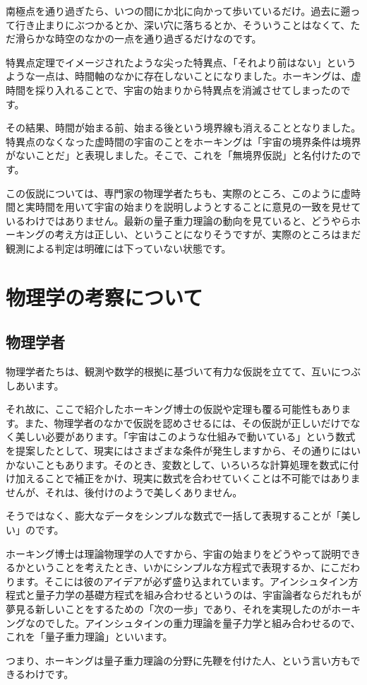 \documentclass[10pt,b5paper,papersize,dvipdfmx]{jsbook}
\begin{document}
南極点を通り過ぎたら、いつの間にか北に向かって歩いているだけ。過去に遡って行き止まりにぶつかるとか、深い穴に落ちるとか、そういうことはなくて、ただ滑らかな時空のなかの一点を通り過ぎるだけなのです。\par
特異点定理でイメージされたような尖った特異点、「それより前はない」というような一点は、時間軸のなかに存在しないことになりました。ホーキングは、虚時間を採り入れることで、宇宙の始まりから特異点を消滅させてしまったのです。\par
その結果、時間が始まる前、始まる後という境界線も消えることとなりました。特異点のなくなった虚時間の宇宙のことをホーキングは「宇宙の境界条件は境界がないことだ」と表現しました。そこで、これを「無境界仮説」と名付けたのです。\par
この仮説については、専門家の物理学者たちも、実際のところ、このように虚時間と実時間を用いて宇宙の始まりを説明しようとすることに意見の一致を見せているわけではありません。最新の量子重力理論の動向を見ていると、どうやらホーキングの考え方は正しい、ということになりそうですが、実際のところはまだ観測による判定は明確には下っていない状態です。

\newpage

\section{物理学の考察について}

\subsection{物理学者}
物理学者たちは、観測や数学的根拠に基づいて有力な仮説を立てて、互いにつぶしあいます。\par
それ故に、ここで紹介したホーキング博士の仮説や定理も覆る可能性もあります。また、物理学者のなかで仮説を認めさせるには、その仮説が正しいだけでなく美しい必要があります。「宇宙はこのような仕組みで動いている」という数式を提案したとして、現実にはさまざまな条件が発生しますから、その通りにはいかないこともあります。そのとき、変数として、いろいろな計算処理を数式に付け加えることで補正をかけ、現実に数式を合わせていくことは不可能ではありませんが、それは、後付けのようで美しくありません。\par
そうではなく、膨大なデータをシンプルな数式で一括して表現することが「美しい」のです。\par
ホーキング博士は理論物理学の人ですから、宇宙の始まりをどうやって説明できるかということを考えたとき、いかにシンプルな方程式で表現するか、にこだわります。そこには彼のアイデアが必ず盛り込まれています。アインシュタイン方程式と量子力学の基礎方程式を組み合わせるというのは、宇宙論者ならだれもが夢見る新しいことをするための「次の一歩」であり、それを実現したのがホーキングなのでした。アインシュタインの重力理論を量子力学と組み合わせるので、これを「量子重力理論」といいます。\par
つまり、ホーキングは量子重力理論の分野に先鞭を付けた人、という言い方もできるわけです。\par
\end{document}

